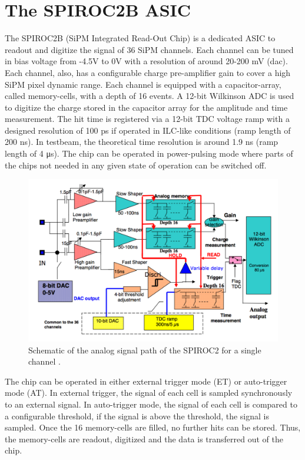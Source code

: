 \section{The SPIROC2B ASIC}
\label{sec:SPIROC2B}

The SPIROC2B (SiPM Integrated Read-Out Chip) \cite{5401891} is a dedicated ASIC to readout and digitize the signal of 36 SiPM channels. Each channel can be tuned in bias voltage from -4.5V to 0V with a resolution of around 20-200 mV (\acrshort{dac}). Each channel, also, has a configurable charge pre-amplifier gain to cover a high SiPM pixel dynamic range. Each channel is equipped with a capacitor-array, called memory-cells, with a depth of 16 events. A 12-bit Wilkinson ADC is used to digitize the charge stored in the capacitor array for the amplitude and time measurement. The hit time is registered via a 12-bit TDC voltage ramp with a designed resolution of 100 ps if operated in ILC-like conditions (ramp length of 200 \si{\nano\second}). In testbeam, the theoretical time resolution is around 1.9 ns (ramp length of 4 \si{\micro\second}). The chip can be operated in power-pulsing mode where parts of the chips not needed in any given state of operation can be switched off.

\begin{figure}[htbp!]
  \centering
  \includegraphics[width=0.7\linewidth]{chap3/fig/SPIROC2B_schematic.png}
  \caption{Schematic of the analog signal path of the SPIROC2 for a single channel \cite{SPIROC2_datasheet}.} \label{fig:SPIROC2B_sche}
\end{figure}

The chip can be operated in either external trigger mode (ET) or auto-trigger mode (AT). In external trigger, the signal of each cell is sampled synchronously to an external signal. In auto-trigger mode, the signal of each cell is compared to a configurable threshold, if the signal is above the threshold, the signal is sampled. Once the 16 memory-cells are filled, no further hits can be stored. Thus, the memory-cells are readout, digitized and the data is transferred out of the chip.

